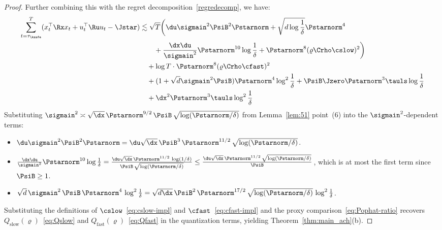 \documentclass[11pt,journal,onecolumn]{IEEEtran}
\begin{document}
\begin{proof}
    Further combining this with the regret decomposition~\eqref{regredecomp}, we have:
    \begin{align}
        \begin{split}
            \sum_{t=\tau_{\ksafe}}^T (x_t^\top \Rx x_t + u_t^\top \Ru u_t - \Jstar)
             & \lesssim \sqrt T \bigg( \du \sigmain^2 \PsiB^2 \Pstarnorm + \sqrt{d \log \frac{1}{\delta}} \Pstarnorm^4            \\
             & \qquad + \frac{\dx\du}{\sigmain^2} \Pstarnorm^{10} \log \frac{1}{\delta} + \Pstarnorm^{8}(\varrho \Crho \cslow)^2 \bigg)       \\
             & \quad + \log T \cdot \Pstarnorm^{8}(\varrho \Crho \cfast)^2 \\
             & \quad + ( 1 + \sqrt d \sigmain^2 \PsiB) \Pstarnorm^4 \log^2 \frac{1}{\delta} + \PsiB \Jzero \Pstarnorm^3 \tauls \log \frac{1}{\delta} \\
             & \quad + \dx^2 \Pstarnorm^3 \tauls \log ^2 \frac{1}{\delta}
        \end{split}
    \end{align}
    Substituting $\sigmain^2 \asymp \sqrt{\dx}\,\Pstarnorm^{9/2}\,\PsiB\,\sqrt{\log(\Pstarnorm/\delta)}$ from Lemma~\ref{lem:51} point~(6) into the $\sigmain^2$-dependent terms:
    \begin{itemize}
        \item $\du\sigmain^2\PsiB^2\Pstarnorm = \du\sqrt{\dx}\,\PsiB^3\,\Pstarnorm^{11/2}\,\sqrt{\log(\Pstarnorm/\delta)}$.
        \item $\frac{\dx\du}{\sigmain^2}\Pstarnorm^{10}\log\frac{1}{\delta} = \frac{\du\sqrt{\dx}\,\Pstarnorm^{11/2}\,\log(1/\delta)}{\PsiB\,\sqrt{\log(\Pstarnorm/\delta)}} \le \frac{\du\sqrt{\dx}\,\Pstarnorm^{11/2}\,\sqrt{\log(\Pstarnorm/\delta)}}{\PsiB}$,
        which is at most the first term since $\PsiB \ge 1$.
        \item $\sqrt{d}\,\sigmain^2\,\PsiB\,\Pstarnorm^4\,\log^2\frac{1}{\delta} = \sqrt{d\dx}\,\PsiB^2\,\Pstarnorm^{17/2}\,\sqrt{\log(\Pstarnorm/\delta)}\,\log^2\frac{1}{\delta}$.
    \end{itemize}
    Substituting the definitions of $\cslow$~\eqref{eq:cslow-impl} and $\cfast$~\eqref{eq:cfast-impl} and the proxy comparison~\eqref{eq:Pophat-ratio} recovers $Q_{\mathrm{slow}}(\varrho)$~\eqref{eq:Qslow} and $Q_{\mathrm{fast}}(\varrho)$~\eqref{eq:Qfast} in the quantization terms, yielding Theorem~\ref{thm:main_ach}(b).
\end{proof}
\end{document}
